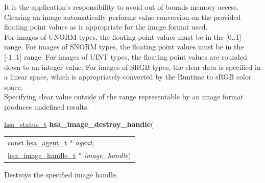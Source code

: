 \documentclass[final]{book}
\newcommand{\hsaarg}[1]{\textit{#1}}
\begin{document}
\begin{appendices}
It is the application's responsibility to avoid out of bounds memory access.\\[2mm]
Clearing an image automatically performs value conversion on the provided floating point values as is appropriate for the image format used.\\[2mm]
For images of UNORM types, the floating point values must be in the [0..1] range. For images of SNORM types, the floating point values must be in the [-1..1] range. For images of UINT types, the floating point values are rounded down to an integer value. For images of SRGB types, the clear data is specified in a linear space, which is appropriately converted by the Runtime to sRGB color space.\\[2mm]
Specifying clear value outside of the range representable by an image format produces undefined results. 


\noindent\begin{tcolorbox}[breakable,nobeforeafter,colframe=white,colback=lightgray,left=0mm]
\hyperlink{group--status-1gad755322e7ff95456520e8abdbe90d225}{hsa_status_t} \hypertarget{group--images-1ga5f2d60a225a2f963af2ff529dba4b6f4}{\textbf{hsa_image_destroy_handle}}(
\vspace{-3.5mm}\begin{longtable}{@{}p{\textwidth}}
\hspace{1.7em}const \hyperlink{group--topology-1gab8db3fb886332a24acac08ec361e1d86}{hsa_agent_t} * \hsaarg{agent},\\
\hspace{1.7em}\hyperlink{group--images-1ga0aeecea8e818df4cec2eccb3a5e85d5f}{hsa_image_handle_t} * \hsaarg{image_handle})\end{longtable}

\end{tcolorbox}
Destroys the specified image handle.


\end{appendices}
\end{document}
